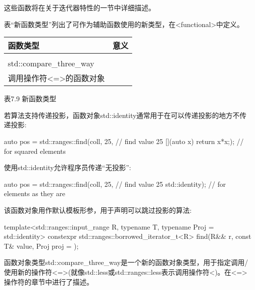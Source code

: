 这些函数将在关于迭代器特性的一节中详细描述。


表“新函数类型”列出了可作为辅助函数使用的新类型，在<functional>中定义。

\begin{longtable}[c]{|l|l|}
\hline
\textbf{函数类型} &
\textbf{意义} \\ \hline
\endfirsthead
%
\endhead
%
\begin{tabular}[c]{@{}l@{}}std::identity\\ std::compare\_three\_way\end{tabular} &
\begin{tabular}[c]{@{}l@{}}返回自身的函数对象\\ 调用操作符\textless{}=\textgreater{}的函数对象\end{tabular} \\ \hline
\end{longtable}

\begin{center}
表7.9 新函数类型
\end{center}

若算法支持传递投影，函数对象std::identity通常用于在可以传递投影的地方不传递投影:

\begin{cpp}
auto pos = std::ranges::find(coll, 25, // find value 25
							[](auto x) {return x*x;}); // for squared elements
\end{cpp}

使用std::identity允许程序员传递“无投影”:

\begin{cpp}
auto pos = std::ranges::find(coll, 25, // find value 25
							std::identity{}); // for elements as they are
\end{cpp}

该函数对象用作默认模板形参，用于声明可以跳过投影的算法:

\begin{cpp}
template<std::ranges::input_range R,
		typename T,
		typename Proj = std::identity>
constexpr std::ranges::borrowed_iterator_t<R>
find(R&& r, const T& value, Proj proj = {});
\end{cpp}

函数对象类型std::compare\_three\_way是一个新的函数对象类型，用于指定调用/使用新的操作符<=>(就像std::less或std::ranges::less表示调用操作符<)。在<=>操作符的章节中进行了描述。


